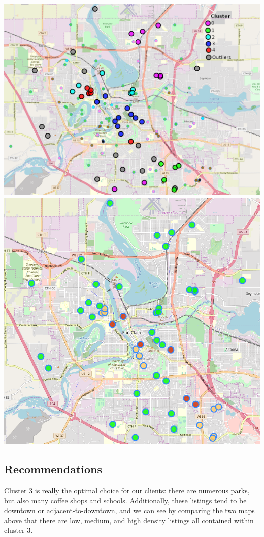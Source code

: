 \documentclass{article}
\begin{document}
\hspace{-0.7cm}\includegraphics[scale=0.36]{Clusters.png}
\includegraphics[scale=0.36]{Densities.png}

\subsection{Recommendations}
Cluster 3 is really the optimal choice for our clients: there are numerous parks, but also many coffee shops and schools. Additionally, these listings tend to be downtown or adjacent-to-downtown, and we can see by comparing the two maps above that there are low, medium, and high density listings all contained within cluster 3. 
\end{document}
